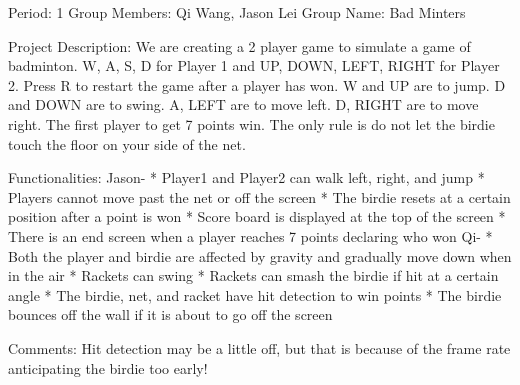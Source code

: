 Period: 1
Group Members: Qi Wang, Jason Lei
Group Name: Bad Minters

Project Description: 
We are creating a 2 player game to simulate a game of badminton.
W, A, S, D for Player 1 and UP, DOWN, LEFT, RIGHT for Player 2.
Press R to restart the game after a player has won.
W and UP are to jump.
D and DOWN are to swing.
A, LEFT are to move left.
D, RIGHT are to move right.
The first player to get 7 points win. 
The only rule is do not let the birdie touch the floor on your side of the net. 

Functionalities:
Jason-
* Player1 and Player2 can walk left, right, and jump
* Players cannot move past the net or off the screen
* The birdie resets at a certain position after a point is won
* Score board is displayed at the top of the screen
* There is an end screen when a player reaches 7 points declaring who won
Qi-
* Both the player and birdie are affected by gravity and gradually move down when in the air
* Rackets can swing
* Rackets can smash the birdie if hit at a certain angle
* The birdie, net, and racket have hit detection to win points
* The birdie bounces off the wall if it is about to go off the screen

Comments:
Hit detection may be a little off, but that is because of the frame rate anticipating the birdie too early!


